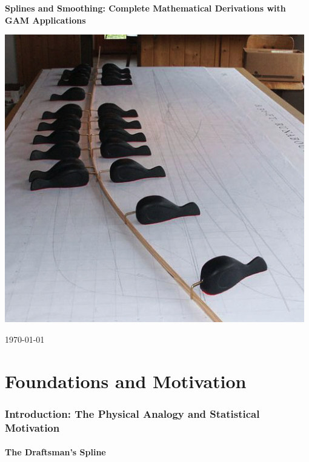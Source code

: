 \documentclass[12pt]{article}
\begin{document}
\begin{titlepage}
 \centering %
 
 \vspace*{1cm} %
 
 {\Huge \bfseries Splines and Smoothing: Complete Mathematical Derivations with GAM Applications}
 
 \vspace{2cm} %
 
 \includegraphics[width=0.6\linewidth]{spline-ducks.png}
 
 \vfill %
  
 \vspace{1cm}
 
 {\large \today}

\end{titlepage}
\maketitle
\tableofcontents
\newpage

\part{Foundations and Motivation}

\section{Introduction: The Physical Analogy and Statistical Motivation}

\subsection{The Draftsman's Spline}
\end{document}
